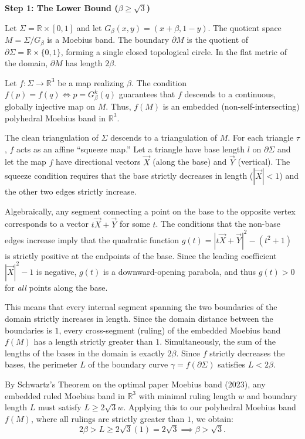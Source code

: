 \documentclass[12pt]{article}
\begin{document}
\vspace{1em}

\noindent\textbf{Step 1: The Lower Bound ($\beta \ge \sqrt{3}$)}

\vspace{0.5em}

Let $\Sigma = \mathbb{R} \times [0,1]$ and let $G_{\beta}(x,y) = (x+\beta, 1-y)$. The quotient space $M = \Sigma / G_{\beta}$ is a Moebius band. The boundary $\partial M$ is the quotient of $\partial \Sigma = \mathbb{R} \times \{0,1\}$, forming a single closed topological circle. In the flat metric of the domain, $\partial M$ has length $2\beta$.

Let $f: \Sigma \to \mathbb{R}^3$ be a map realizing $\beta$. The condition $f(p)=f(q) \iff p = G_{\beta}^k(q)$ guarantees that $f$ descends to a continuous, globally injective map on $M$. Thus, $f(M)$ is an embedded (non-self-intersecting) polyhedral Moebius band in $\mathbb{R}^3$. 

The clean triangulation of $\Sigma$ descends to a triangulation of $M$. For each triangle $\tau$, $f$ acts as an affine ``squeeze map.'' Let a triangle have base length $l$ on $\partial \Sigma$ and let the map $f$ have directional vectors $\vec{X}$ (along the base) and $\vec{Y}$ (vertical). The squeeze condition requires that the base strictly decreases in length ($|\vec{X}| < 1$) and the other two edges strictly increase. 

Algebraically, any segment connecting a point on the base to the opposite vertex corresponds to a vector $t \vec{X} + \vec{Y}$ for some $t$. The conditions that the non-base edges increase imply that the quadratic function $g(t) = |t \vec{X} + \vec{Y}|^2 - (t^2 + 1)$ is strictly positive at the endpoints of the base. Since the leading coefficient $|\vec{X}|^2 - 1$ is negative, $g(t)$ is a downward-opening parabola, and thus $g(t) > 0$ for \emph{all} points along the base. 

This means that every internal segment spanning the two boundaries of the domain strictly increases in length. Since the domain distance between the boundaries is $1$, every cross-segment (ruling) of the embedded Moebius band $f(M)$ has a length strictly greater than $1$. 
Simultaneously, the sum of the lengths of the bases in the domain is exactly $2\beta$. Since $f$ strictly decreases the bases, the perimeter $L$ of the boundary curve $\gamma = f(\partial \Sigma)$ satisfies $L < 2\beta$.

By Schwartz's Theorem on the optimal paper Moebius band (2023), any embedded ruled Moebius band in $\mathbb{R}^3$ with minimal ruling length $w$ and boundary length $L$ must satisfy $L \ge 2\sqrt{3} w$. 
Applying this to our polyhedral Moebius band $f(M)$, where all rulings are strictly greater than $1$, we obtain:
\[
2\beta > L \ge 2\sqrt{3}(1) = 2\sqrt{3} \implies \beta > \sqrt{3}.
\]
\end{document}
